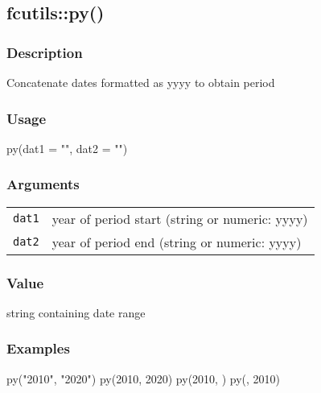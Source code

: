 \documentclass[
  letterpaper,
  DIV=11,
  numbers=noendperiod]{scrreport}
\newenvironment{Shaded}{\begin{snugshade}}{\end{snugshade}}
\newcommand{\AttributeTok}[1]{\textcolor[rgb]{0.40,0.45,0.13}{#1}}
\newcommand{\DecValTok}[1]{\textcolor[rgb]{0.68,0.00,0.00}{#1}}
\newcommand{\FunctionTok}[1]{\textcolor[rgb]{0.28,0.35,0.67}{#1}}
\newcommand{\NormalTok}[1]{\textcolor[rgb]{0.00,0.23,0.31}{#1}}
\newcommand{\StringTok}[1]{\textcolor[rgb]{0.13,0.47,0.30}{#1}}
\begin{document}
\subsection{fcutils::py()}\label{fcutilspy}

\subsubsection{Description}\label{description-22}

Concatenate dates formatted as yyyy to obtain period

\subsubsection{Usage}\label{usage-22}

\begin{Shaded}
\begin{Highlighting}[]
\FunctionTok{py}\NormalTok{(}\AttributeTok{dat1 =} \StringTok{""}\NormalTok{, }\AttributeTok{dat2 =} \StringTok{""}\NormalTok{)}
\end{Highlighting}
\end{Shaded}

\subsubsection{Arguments}\label{arguments-22}

\begin{longtable}[]{@{}ll@{}}
\toprule\noalign{}
\endhead
\bottomrule\noalign{}
\endlastfoot
\texttt{dat1} & year of period start (string or numeric: yyyy) \\
\texttt{dat2} & year of period end (string or numeric: yyyy) \\
\end{longtable}

\subsubsection{Value}\label{value-22}

string containing date range

\subsubsection{Examples}\label{examples-22}

\begin{Shaded}
\begin{Highlighting}[]
\FunctionTok{py}\NormalTok{(}\StringTok{"2010"}\NormalTok{, }\StringTok{"2020"}\NormalTok{)}
\FunctionTok{py}\NormalTok{(}\DecValTok{2010}\NormalTok{, }\DecValTok{2020}\NormalTok{)}
\FunctionTok{py}\NormalTok{(}\DecValTok{2010}\NormalTok{, )}
\FunctionTok{py}\NormalTok{(, }\DecValTok{2010}\NormalTok{)}
\end{Highlighting}
\end{Shaded}
\end{document}
